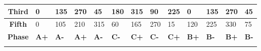 \documentclass{reportClass}
\begin{document}
\begin{table}[h!]
\begin{tabular}{|cllllllllllll|}
\multicolumn{1}{|c|}{\textbf{Third}}   & \multicolumn{1}{l|}{0}                                   & \multicolumn{1}{l|}{135}                                 & \multicolumn{1}{l|}{270}                                 & \multicolumn{1}{l|}{45}                                  & \multicolumn{1}{l|}{180}                                 & \multicolumn{1}{l|}{315}                                 & \multicolumn{1}{l|}{90}                                  & \multicolumn{1}{l|}{225}                                 & \multicolumn{1}{l|}{0}                                   & \multicolumn{1}{l|}{135}                                 & \multicolumn{1}{l|}{270}                                 & 45                                  \\ \hline
\multicolumn{1}{|c|}{\textbf{Fifth}}   & \multicolumn{1}{l|}{0}                                   & \multicolumn{1}{l|}{105}                                 & \multicolumn{1}{l|}{210}                                 & \multicolumn{1}{l|}{315}                                 & \multicolumn{1}{l|}{60}                                  & \multicolumn{1}{l|}{165}                                 & \multicolumn{1}{l|}{270}                                 & \multicolumn{1}{l|}{15}                                  & \multicolumn{1}{l|}{120}                                 & \multicolumn{1}{l|}{225}                                 & \multicolumn{1}{l|}{330}                                 & 75                                  \\ \hline
\multicolumn{1}{|c|}{\textbf{Phase}}   & \multicolumn{1}{l|}{\cellcolor[HTML]{FCFF2F}\textbf{A+}} & \multicolumn{1}{l|}{\cellcolor[HTML]{FCFF2F}\textbf{A-}} & \multicolumn{1}{l|}{\cellcolor[HTML]{FCFF2F}\textbf{A+}} & \multicolumn{1}{l|}{\cellcolor[HTML]{FCFF2F}\textbf{A-}} & \multicolumn{1}{l|}{\cellcolor[HTML]{CBCEFB}\textbf{C-}} & \multicolumn{1}{l|}{\cellcolor[HTML]{CBCEFB}\textbf{C+}} & \multicolumn{1}{l|}{\cellcolor[HTML]{CBCEFB}\textbf{C-}} & \multicolumn{1}{l|}{\cellcolor[HTML]{CBCEFB}\textbf{C+}} & \multicolumn{1}{l|}{\cellcolor[HTML]{90E3FB}\textbf{B+}} & \multicolumn{1}{l|}{\cellcolor[HTML]{90E3FB}\textbf{B-}} & \multicolumn{1}{l|}{\cellcolor[HTML]{90E3FB}\textbf{B+}} & \cellcolor[HTML]{90E3FB}\textbf{B-} \\ \hline
\textbf{}                              &                                                          &                                                          &                                                          &                                                          &                                                          &                                                          &                                                          &                                                          &                                                          &                                                          &                                                          &                                     \\ \hline

\end{tabular}
\end{table}
\end{document}
